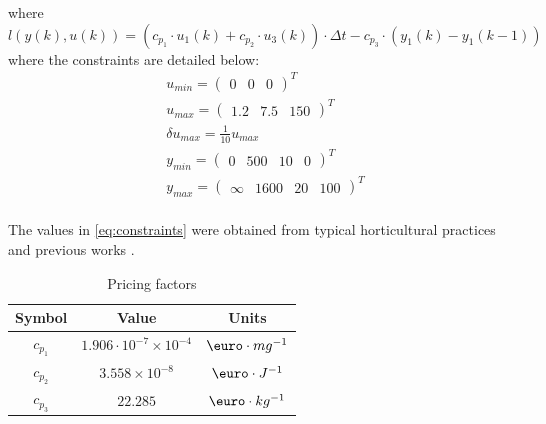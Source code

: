 where 
\begin{equation}
	l(y(k),u(k)) = (c_{p_1} \cdot u_1(k) + c_{p_2} \cdot u_3(k)) \cdot \Delta t  - c_{p_3} \cdot (y_1(k) - y_1(k-1))
\end{equation}
where the constraints are detailed below:
\begin{equation}\label{eq:constraints}
	\begin{aligned}
		&u_{min} = \begin{pmatrix}
			0&0&0
		\end{pmatrix}^T \\
		&u_{max} = \begin{pmatrix}
			1.2&7.5&150
		\end{pmatrix}^T	\\
		& \delta u_{max} = \frac{1}{10} u_{max}\\
		&y_{min} = \begin{pmatrix}
			0&500&10&0
		\end{pmatrix}^T \\
		&y_{max} = \begin{pmatrix}
			\infty&1600&20&100
		\end{pmatrix}^T	\\
	\end{aligned}
\end{equation}

The values in \autoref{eq:constraints} were obtained from typical horticultural practices and previous works \cite{boersmaRobustSamplebasedModel2022,morcegoReinforcementLearningModel2023,jansenOptimalControlLettuce2023}. 

\begin{table}[H]
	\centering
	\begin{tabular}{|c|c|c|}
		\hline
		\textbf{Symbol} & \textbf{Value} & \textbf{Units} \\
		\hline
		$c_{p_1}$ & $1.906\cdot 10^{-7} \times 10^{-4}$ & $ \text{\euro} \cdot mg^{-1}$ \\
		$c_{p_2}$ & $3.558 \times 10^{-8}$ & $ \text{\euro} \cdot J^{-1}$ \\
		$c_{p_3}$ & $22.285$ & $\text{\euro} \cdot kg^{-1}$ \\ 
		\hline
	\end{tabular}
	\caption{Pricing factors}
	\label{tab:pricing_factors}
\end{table}